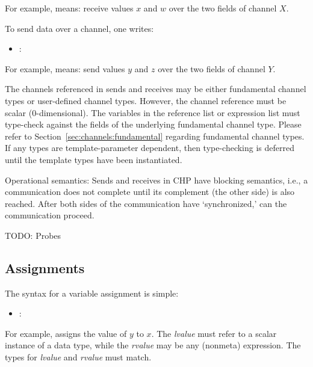 \noindent
For example,  means: receive values $x$ and $w$ over
the two fields of channel $X$.  

To send data over a channel, one writes:

\begin{itemize}
\item {} :  \bang
	\ttt{(}  \ttt{)}
\end{itemize}

\noindent
For example,  means: send values $y$ and $z$ over
the two fields of channel $Y$.  

The channels referenced in sends and receives may be 
either fundamental channel types or user-defined channel types.  
However, the channel reference must be scalar (0-dimensional).  
The variables in the reference list or expression list must type-check
against the fields of the underlying fundamental channel type.  
Please refer to Section~\ref{sec:channels:fundamental} 
regarding fundamental channel types.  
If any types are template-parameter dependent, then type-checking
is deferred until the template types have been instantiated.  

Operational semantics:
Sends and receives in CHP have blocking semantics, i.e., 
a communication does not complete until its complement (the other side)
is also reached.  
After both sides of the communication have `synchronized,'
can the communication proceed.  

TODO: Probes

\subsection{Assignments}
\label{sec:chp:stmts:assign}

The syntax for a variable assignment is simple:

\begin{itemize}
\item {} :  \assign\ 
\end{itemize}

\noindent
For example,  assigns the value of $y$ to $x$.  
The \emph{lvalue} must refer to a scalar instance of a data type, 
while the \emph{rvalue} may be any (nonmeta) expression.  
The types for \emph{lvalue} and \emph{rvalue} must match.  

